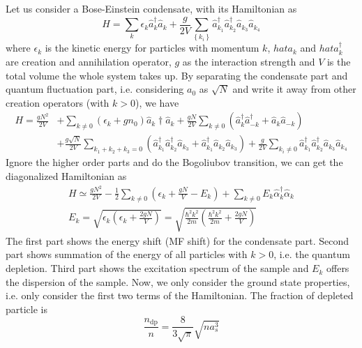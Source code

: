 Let us consider a Bose-Einstein condensate, with its Hamiltonian as
\begin{equation}
H=\sum_k\epsilon_k\hat{a}_k^\dagger\hat{a}_k+\frac{g}{2V}\sum_{\left\{k_i\right\}}\hat{a}_{k_1}^\dagger\hat{a}_{k_2}^\dagger\hat{a}_{k_3}\hat{a}_{k_4}
\end{equation}
where $\epsilon_k$ is the kinetic energy for particles with momentum $k$, $hat{a}_k$ and $hat{a}_k^\dagger$ are creation and annihilation operator, $g$ as the interaction strength and $V$ is the total volume the whole system takes up.
By separating the condensate part and quantum fluctuation part, i.e. considering $a_0$ as $\sqrt{N}$ and write it away from other creation operators (with $k>0$), we have
\begin{equation}
\begin{split}
H=\frac{g N^2}{2V}&+\sum_{k\neq0}\left(\epsilon_k+gn_0\right)\hat{a}_k\dagger\hat{a}_k+\frac{gN}{2V}\sum_{k\neq0}\left(\hat{a}_k^\dagger\hat{a}_{-k}^\dagger+\hat{a}_k\hat{a}_{-k}\right)\\
&+\frac{g\sqrt{N}}{2V}\sum_{k_1+k_2+k_3=0}\left(\hat{a}_{k_1}^\dagger\hat{a}_{k_2}^\dagger\hat{a}_{k_3}+\hat{a}_{k_1}^\dagger\hat{a}_{k_2}\hat{a}_{k_3}\right)+\frac{g}{2V}\sum_{k_i\neq0}\hat{a}_{k_1}^\dagger\hat{a}_{k_2}^\dagger\hat{a}_{k_3}\hat{a}_{k_4}
\end{split}
\end{equation}
Ignore the higher order parts and do the Bogoliubov transition, we can get the diagonalized Hamiltonian as
\begin{equation}
\begin{split}
H\simeq \frac{g N^2}{2V}-\frac{1}{2}\sum _{k\neq 0} \left(\epsilon _k+\frac{g N}{V}-E_k\right)+\sum _{k\neq 0} E_k\hat{\alpha }_k^\dagger\hat{\alpha}_k\\
E_k=\sqrt{\epsilon_k\left(\epsilon_k+\frac{2gN}{V}\right)}=\sqrt{\frac{\hbar^2k^2}{2m}\left(\frac{\hbar^2k^2}{2m}+\frac{2gN}{V}\right)}
\end{split}
\end{equation}
The first part shows the energy shift (MF shift) for the condensate part. Second part shows summation of the energy of all particles with $k>0$, i.e. the quantum depletion. Third part shows the excitation spectrum of the sample and $E_k$ offers the dispersion of the sample. Now, we only consider the ground state properties, i.e. only consider the first two terms of the Hamiltonian. The fraction of depleted particle is
\begin{equation}
\frac{n_{\text{dp}}}{n}=\frac{8}{3\sqrt{\pi }}\sqrt{n a_s^3}
\end{equation}
